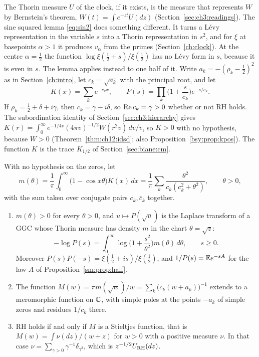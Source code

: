 The Thorin measure $U$ of the clock, if it exists, is the measure that represents $W$ by Bernstein's theorem, $W(t)=\int e^{-zt}U(dz)$ (Section~\ref{sec:ch3:readings}). The sine squared lemma \eqref{eq:sin2} does something different. It turns a L\'evy representation in the variable $s$ into a Thorin representation in $s^2$, and for $\xi$ at basepoints $\alpha>1$ it produces $v_\alpha$ from the primes (Section~\ref{ch:clock}). At the centre $\alpha=\frac12$ the function $\log\xi(\frac12+s)/\xi(\frac12)$ has no L\'evy form in $s$, because it is even in $s$. The lemma applies instead to one half of it. Write $a_k=-(\rho_k-\frac12)^2$ as in Section~\ref{ch:intro}, let $c_k=\sqrt{a_k}$ with the principal root, and let
\[
K(x)=\sum_ke^{-c_kx},\qquad P(s)=\prod_k\Big(1+\frac s{c_k}\Big)e^{-s/c_k}.
\]
If $\rho_k=\frac12+\delta+i\gamma$, then $c_k=\gamma-i\delta$, so $\operatorname{Re} c_k=\gamma>0$ whether or not RH holds. The subordination identity of Section~\ref{sec:ch3:hierarchy} gives $K(r)=\int_0^\infty e^{-1/4v}(4\pi v)^{-1/2}W(r^2v)\,dv/v$, so $K>0$ with no hypothesis, because $W>0$ (Theorem~\ref{thm:ch12:idsd}; also Proposition~\ref{bsy:prop:kpos}). The function $K$ is the trace $K_{1/2}$ of Section~\ref{sec:biane:cm}.

\begin{theorem}\label{riemanncont:thm:half}
With no hypothesis on the zeros, let
\[
m(\theta)=\frac1\pi\int_0^\infty\big(1-\cos x\theta\big)K(x)\,dx=\frac1\pi\sum_k\frac{\theta^2}{c_k(c_k^2+\theta^2)},\qquad\theta>0,
\]
with the sum taken over conjugate pairs $c_k,\bar c_k$ together.
\begin{enumerate}
\item[(i)] $m(\theta)>0$ for every $\theta>0$, and $u\mapsto P(\sqrt u)$ is the Laplace transform of a GGC whose Thorin measure has density $m$ in the chart $\theta=\sqrt z$:
\[
-\log P(s)=\int_0^\infty\log\Big(1+\frac{s^2}{\theta^2}\Big)m(\theta)\,d\theta,\qquad s\ge0 .
\]
Moreover $P(s)P(-s)=\xi(\frac12+is)/\xi(\frac12)$, and $1/P(s)=\mathbb{E} e^{-sA}$ for the law $A$ of Proposition~\ref{sm:prop:half}.
\item[(ii)] The function $M(w)=\pi m(\sqrt w)/w=\sum_k\big(c_k(w+a_k)\big)^{-1}$ extends to a meromorphic function on $\mathbb{C}$, with simple poles at the points $-a_k$ of simple zeros and residues $1/c_k$ there.
\item[(iii)] RH holds if and only if $M$ is a Stieltjes function, that is $M(w)=\int\nu(dz)/(w+z)$ for $w>0$ with a positive measure $\nu$. In that case $\nu=\sum_{\gamma>0}\gamma^{-1}\delta_{\gamma^2}$, which is $z^{-1/2}U_{\mathrm{RH}}(dz)$.
\end{enumerate}
\end{theorem}

